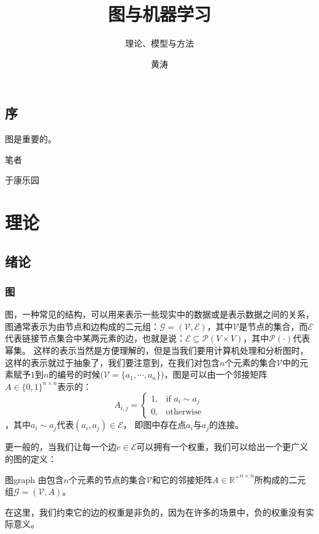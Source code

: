 \documentclass[color=gray,base=hide,cn]{elegantbook}
\title{图与机器学习}
\subtitle{理论、模型与方法}
\author{黄涛}
\institute{中山大学数学学院}
\date{}
\begin{document}
\maketitle


\chapter*{序}
图是重要的。
\begin{flushright}
笔者

于康乐园
\end{flushright}

\tableofcontents
\mainmatter
\hypersetup{pageanchor=true}
\part{理论}
\chapter{绪论}
\section{图}
图，一种常见的结构，可以用来表示一些现实中的数据或是表示数据之间的关系，图通常表示为由节点和边构成的二元组：$\mathcal{G} = (\mathcal{V},\mathcal{E})$，其中$\mathcal{V}$是节点的集合，而$\mathcal{E}$代表链接节点集合中某两元素的边，也就是说：$\mathcal{E} \subseteq \mathcal{P}(V \times V)$，其中$\mathcal{P}(\cdot)$代表幂集。
这样的表示当然是方便理解的，但是当我们要用计算机处理和分析图时，这样的表示就过于抽象了，我们要注意到，在我们对包含$n$个元素的集合$\mathcal{V}$中的元素赋予$1$到$n$的编号的时候($\mathcal{V} = \{a_1, \cdots, a_n\}$)，图是可以由一个邻接矩阵$A \in \{0,1\}^{n\times n}$表示的：
\begin{equation}
    A_{i,j} = \left\{\begin{matrix}
1, & \text{if } a_i \sim a_j \\ 
0, & \text{otherwise}
\end{matrix}\right.
\end{equation}
，其中$a_i \sim a_j$代表$(a_i,a_j) \in \mathcal{E} $， 即图中存在点$a_i$与$a_j$的连接。

更一般的，当我们让每一个边$e\in \mathcal{E}$可以拥有一个权重，我们可以给出一个更广义的图的定义：
\begin{definition}{图}{graph}
    由包含$n$个元素的节点的集合$\mathcal{V}$和它的邻接矩阵$A \in {\mathbb{R}^{+}}^{n\times n}$所构成的二元组$\mathcal{G} = (\mathcal{V},A)$。
\end{definition}
在这里，我们约束它的边的权重是非负的，因为在许多的场景中，负的权重没有实际意义。
\end{document}
